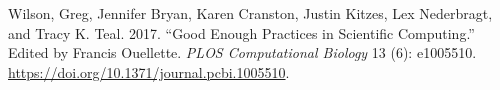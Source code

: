\documentclass[
  letterpaper,
  DIV=11,
  numbers=noendperiod]{scrreprt}
\newlength{\cslhangindent}
\newlength{\cslentryspacingunit} %
\newenvironment{CSLReferences}[2] %
 {%
  \setlength{\parindent}{0pt}
  \ifodd #1
  \let\oldpar\par
  \def\par{\hangindent=\cslhangindent\oldpar}
  \fi
  \setlength{\parskip}{#2\cslentryspacingunit}
 }%
 {}
\begin{document}
\hypertarget{refs}{}
\begin{CSLReferences}{1}{0}
\leavevmode{}%
Wilson, Greg, Jennifer Bryan, Karen Cranston, Justin Kitzes, Lex
Nederbragt, and Tracy K. Teal. 2017. {``Good Enough Practices in
Scientific Computing.''} Edited by Francis Ouellette. \emph{PLOS
Computational Biology} 13 (6): e1005510.
\url{https://doi.org/10.1371/journal.pcbi.1005510}.

\end{CSLReferences}
\end{document}
